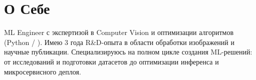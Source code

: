 \documentclass[letterpaper,11pt]{article}
\begin{document}

\section{О Себе}
 \begin{itemize}[leftmargin=0.15in, label={}]
    \small{\item{
     ML Engineer с экспертизой в Computer Vision и оптимизации алгоритмов (Python / \cpp).
     Имею 3 года R\&D-опыта в области обработки изображений и научные публикации.
     Специализируюсь на полном цикле создания ML-решений: от исследований и подготовки датасетов до оптимизации 
     инференса и микросервисного деплоя.
    }} 
 \end{itemize}

\def\currentRole{CV-инженер}


\def\currentProjects{%
  \projectChangeDetector
  \projectAccValidation
  \projectBotDetector
}





\end{document}
